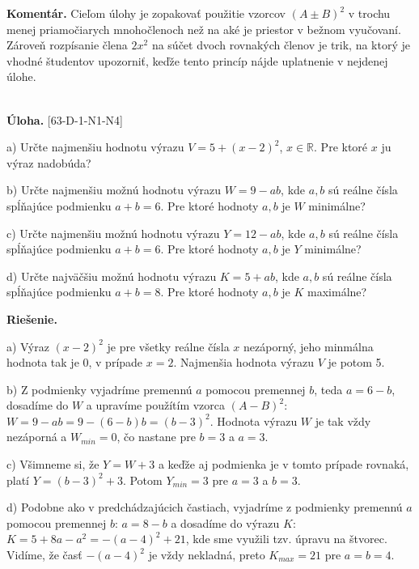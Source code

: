 \documentclass[11pt,a4paper,oneside,final]{book}
\newcommand{\RR}{\mathbb{R}}
\newcommand{\kom}{\textbf{Komentár.} }
\newcommand{\ul}{\textbf{Úloha.} }
\newcommand{\rie}{\textbf{Riešenie.} }
\begin{document}
\kom Cieľom úlohy je zopakovať použitie vzorcov $(A\pm B)^2$ v trochu menej priamočia\-rych mnohočlenoch než na aké je priestor v bežnom vyučovaní. Zároveň rozpísanie člena $2x^2$ na súčet dvoch rovnakých členov je trik, na ktorý je vhodné študentov upozorniť, keďže tento princíp nájde uplatnenie v nejdenej úlohe.\\
\\
\begin{tcolorbox}[breakable,notitle,boxrule=0pt,colback=light-gray,colframe=light-gray]\ul [63-D-1-N1-N4]

a) Určte najmenšiu hodnotu výrazu $V = 5 + (x - 2)^2$, $x \in \RR$. Pre ktoré $x$ ju výraz nadobúda?

b) Určte najmenšiu možnú hodnotu výrazu $W = 9 - ab$, kde $a, b$ sú reálne čísla spĺňajúce podmienku $a + b = 6$. Pre ktoré hodnoty $a, b$ je $W$ minimálne?

c) Určte najmenšiu možnú hodnotu výrazu $Y = 12-ab$, kde $a, b$ sú reálne čísla spĺňajúce podmienku $a + b = 6$. Pre ktoré hodnoty $a, b$ je $Y$ minimálne?

d) Určte najväčšiu možnú hodnotu výrazu $K = 5 + ab$, kde $a, b$ sú reálne čísla spĺňajúce podmienku $a + b = 8$. Pre ktoré hodnoty $a, b$ je $K$ maximálne?

\end{tcolorbox}

\rie

a) Výraz $(x-2)^2$ je pre všetky reálne čísla $x$ nezáporný, jeho minmálna hodnota tak je 0, v prípade $x=2$. Najmenšia hodnota výrazu $V$ je potom 5.

b) Z podmienky vyjadríme premennú $a$ pomocou premennej $b$, teda $a=6-b$, dosadíme do $W$ a upravíme použítím vzorca $(A-B)^2$: $W=9-ab=9-(6-b)b=(b-3)^2$. Hodnota výrazu $W$ je tak vždy nezáporná a $W_{min}=0$, čo nastane pre $b=3$ a $a=3$.

c) Všimneme si, že $Y=W+3$ a keďže aj podmienka je v tomto prípade rovnaká, platí $Y=(b-3)^2+3$. Potom $Y_{min}=3$ pre $a=3$ a $b=3$.

d) Podobne ako v predchádzajúcich častiach, vyjadríme z podmienky premennú $a$ pomocou premennej $b$: $a=8-b$ a dosadíme do výrazu $K$: $K = 5 + 8a - a^2= -(a - 4)^2+ 21$, kde sme využili tzv. úpravu na štvorec. Vidíme, že časť $-(a-4)^2$ je vždy nekladná, preto $K_{max}=21$ pre $a = b = 4$.\\
\end{document}
